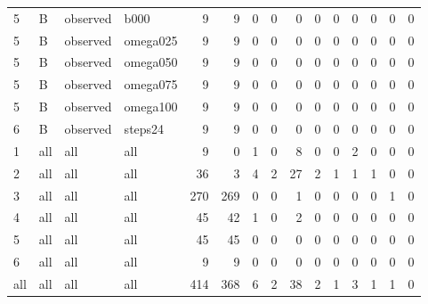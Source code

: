 \begin{tabular}{llllrrrrrrrrrrr}
5 & B & observed & b000 & 9 & 9 & 0 & 0 & 0 & 0 & 0 & 0 & 0 & 0 & 0 \\
5 & B & observed & omega025 & 9 & 9 & 0 & 0 & 0 & 0 & 0 & 0 & 0 & 0 & 0 \\
5 & B & observed & omega050 & 9 & 9 & 0 & 0 & 0 & 0 & 0 & 0 & 0 & 0 & 0 \\
5 & B & observed & omega075 & 9 & 9 & 0 & 0 & 0 & 0 & 0 & 0 & 0 & 0 & 0 \\
5 & B & observed & omega100 & 9 & 9 & 0 & 0 & 0 & 0 & 0 & 0 & 0 & 0 & 0 \\
6 & B & observed & steps24 & 9 & 9 & 0 & 0 & 0 & 0 & 0 & 0 & 0 & 0 & 0 \\
1 & all & all & all & 9 & 0 & 1 & 0 & 8 & 0 & 0 & 2 & 0 & 0 & 0 \\
2 & all & all & all & 36 & 3 & 4 & 2 & 27 & 2 & 1 & 1 & 1 & 0 & 0 \\
3 & all & all & all & 270 & 269 & 0 & 0 & 1 & 0 & 0 & 0 & 0 & 1 & 0 \\
4 & all & all & all & 45 & 42 & 1 & 0 & 2 & 0 & 0 & 0 & 0 & 0 & 0 \\
5 & all & all & all & 45 & 45 & 0 & 0 & 0 & 0 & 0 & 0 & 0 & 0 & 0 \\
6 & all & all & all & 9 & 9 & 0 & 0 & 0 & 0 & 0 & 0 & 0 & 0 & 0 \\
all & all & all & all & 414 & 368 & 6 & 2 & 38 & 2 & 1 & 3 & 1 & 1 & 0 \\
\bottomrule
\end{tabular}
